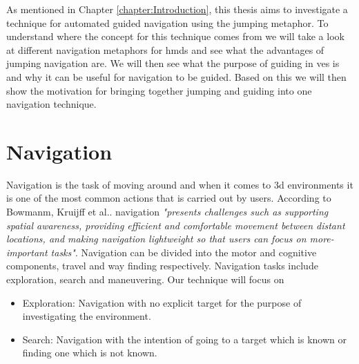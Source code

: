 \label{chapter:Related Work}
As mentioned in Chapter \ref{chapter:Introduction}, this thesis aims to investigate a technique for automated guided navigation using the jumping metaphor. To understand where the concept for this technique comes from we will take a look at different navigation metaphors for \acrshort{hmd}s and see what the advantages of jumping navigation are. We will then see what the purpose of guiding in \acrshort{ve}s is and why it can be useful for navigation to be guided. Based on this we will then show the motivation for bringing together jumping and guiding into one navigation technique. 

\section{Navigation}
\label{section:RW Navigation}

Navigation is the task of moving around and when it comes to \acrfull{3d} environments it is one of the most common actions that is carried out by users. According to Bowmanm, Kruijff et al.. navigation \textit{"presents challenges such as supporting spatial awareness, providing efficient and comfortable movement between distant locations, and making navigation lightweight so that users can focus on more-important tasks"}. Navigation can be divided into the motor and cognitive components, travel and way finding respectively. Navigation tasks include exploration, search and maneuvering\cite{Bowman2001}. Our technique will focus on 
\begin{itemize}
	\item Exploration: Navigation with no explicit target for the purpose of investigating the environment.
	\item Search: Navigation with the intention of going to a target which is known or finding one which is not known.
\end{itemize}

